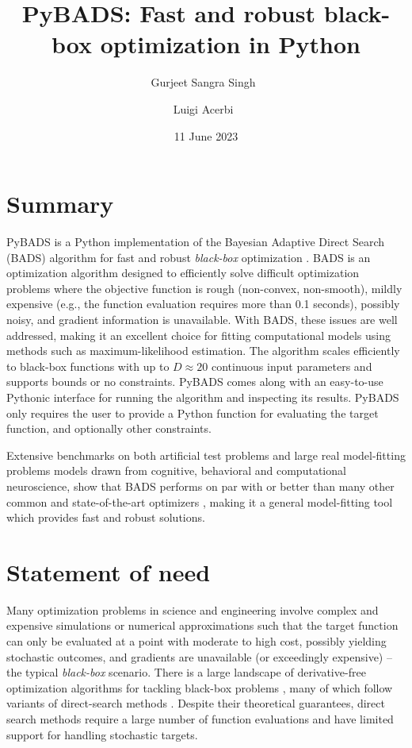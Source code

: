 \documentclass[
]{article}
\title{PyBADS: Fast and robust black-box optimization in Python}
\author[1, 3%
  ]{Gurjeet Sangra Singh%
    \,%
    }
\author[2%
  ]{Luigi Acerbi%
    \,%
    }
\affil[1]{University of Geneva}
\affil[2]{University of Helsinki}
\affil[3]{University of Applied Sciences and Art Western Switzerland (HES-SO)}
\date{11 June 2023}
\begin{document}
\maketitle

\hypertarget{summary}{%
\section{Summary}\label{summary}}
PyBADS is a Python implementation of the Bayesian Adaptive Direct Search (BADS) algorithm for fast and robust \textit{black-box} optimization \parencite{acerbi2017practical}. BADS is an optimization algorithm designed to efficiently solve difficult optimization problems where the objective function is rough (non-convex, non-smooth), mildly expensive (e.g., the function evaluation requires more than 0.1 seconds), possibly noisy, and gradient information is unavailable. With BADS, these issues are well addressed, making it an excellent choice for fitting computational models using methods such as maximum-likelihood estimation.
The algorithm scales efficiently to black-box functions with up to $D \approx 20$ continuous input parameters and supports bounds or no constraints. PyBADS comes along with an easy-to-use Pythonic interface for running the algorithm and inspecting its results. PyBADS only requires the user to provide a Python function for evaluating the target function, and optionally other constraints.

Extensive benchmarks on both artificial test problems and large real model-fitting problems models drawn from cognitive, behavioral and computational neuroscience, show that BADS performs on par with or better than many other common and state-of-the-art optimizers \parencite{acerbi2017practical}, making it a general model-fitting tool which provides fast and robust solutions. 

\hypertarget{statement-of-need}{%
\section{Statement of need}\label{statement-of-need}}

Many optimization problems in science and engineering involve complex and expensive simulations or numerical approximations such that the target function can only be evaluated at a point with moderate to high cost, possibly yielding stochastic outcomes, and gradients are unavailable (or exceedingly expensive) -- the typical \textit{black-box} scenario. There is a large landscape of derivative-free optimization algorithms for tackling black-box problems  \parencite{Rios2013}, many of which follow variants of direct-search methods \parencite{MADS, stoMADS, orthoMADS, deng2006adaptation}.
Despite their theoretical guarantees, direct search methods require a large number of function evaluations and have limited support for handling stochastic targets. 
\end{document}
